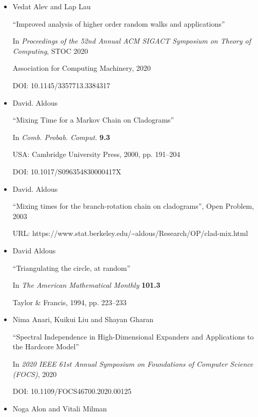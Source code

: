 \begin{itemize}

      

\item[] [AL20]
Vedat Alev and Lap Lau

“Improved analysis of higher order random walks and applications”

In \emph{Proceedings of the 52nd Annual ACM SIGACT Symposium on Theory of Computing}, STOC 2020

Association for Computing Machinery, 2020

DOI: 10.1145/3357713.3384317


      

\item[] [Ald00]
David. Aldous

“Mixing Time for a Markov Chain on Cladograms”

In \emph{Comb. Probab. Comput.} \textbf{9.3}

USA: Cambridge University Press, 2000, pp. 191–204

DOI: 10.1017/S096354830000417X


      

\item[] [Ald03]
David. Aldous

“Mixing times for the branch-rotation chain on cladograms”, Open Problem, 2003

URL: https://www.stat.berkeley.edu/\textasciitilde{}aldous/Research/OP/clad-mix.html


      

\item[] [Ald94]
David Aldous

“Triangulating the circle, at random”

In \emph{The American Mathematical Monthly} \textbf{101.3}

Taylor \& Francis, 1994, pp. 223–233


      

\item[] [ALG20]
Nima Anari, Kuikui Liu and Shayan Gharan

“Spectral Independence in High-Dimensional Expanders and Applications to the Hardcore Model”

In \emph{2020 IEEE 61st Annual Symposium on Foundations of Computer Science (FOCS)}, 2020

DOI: 10.1109/FOCS46700.2020.00125


      

\item[] [AM85]
Noga Alon and Vitali Milman


\end{itemize}
